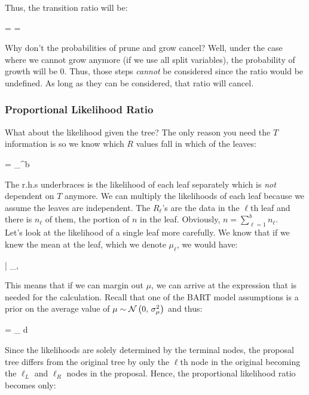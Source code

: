 Thus, the transition ratio will be:

\beqn
{} =  =  
\eeqn

Why don't the probabilities of prune and grow cancel? Well, under the case where we cannot grow anymore (if we use all split variables), the probability of growth will be 0. Thus, those steps \textit{cannot} be considered since the ratio would be undefined. As long as they can be considered, that ratio will cancel.

\subsubsection*{Proportional Likelihood Ratio}


What about the likelihood given the tree? The only reason you need the $T$ information is so we know which $R$ values fall in which of the leaves:

\beqn
{} = \prod_{}^{b} \underbrace{\cprob{\Rlonetonl}{\sigsq}}
\eeqn

The r.h.s underbraces is the likelihood of each leaf separately which is \textit{not} dependent on $T$ anymore. We can multiply the likelihoods of each leaf because we assume the leaves are independent. The $R_\ell$'s are the data in the $\ell$th leaf and there is $n_\ell$ of them, the portion of $n$ in the leaf. Obviously, $n = \sum_{\ell=1}^b n_\ell$.\\

Let's look at the likelihood of a single leaf more carefully. We know that if we knew the mean at the leaf, which we denote $\mu_\ell$, we would have:

\beqn
\Rlonetonl | \mu_\ell, \sigsq ~\iid~ \normnot{\mu}{\sigsq}
\eeqn

This means that if we can margin out $\mu$, we can arrive at the expression that is needed for the calculation. Recall that one of the BART model assumptions is a prior on the average value of $\mu \sim \mathcal{N}\left(0,\,\sigma^2_\mu\right)$ and thus:

\beqn
\cprob{\Rlonetonl}{\sigsq} = \int_\reals \cprob{\Rlonetonl}{\mu, \sigsq} \prob{\mu; \sigsq_\mu} d\mu
\eeqn

Since the likelihoods are solely determined by the terminal nodes, the proposal tree differs from the original tree by only the $\ell$th node in the original becoming the $\ell_L$ and $\ell_R$ nodes in the proposal. Hence, the proportional likelihood ratio becomes only:

